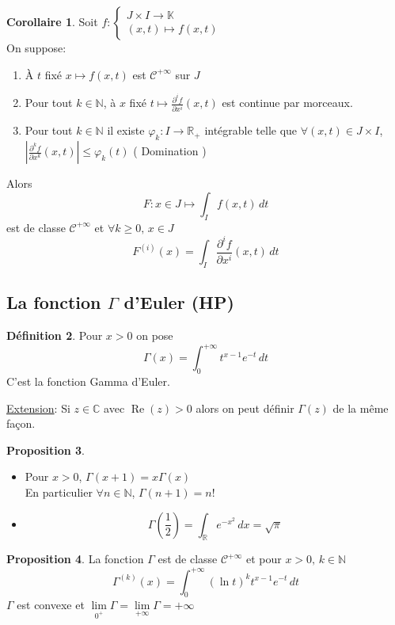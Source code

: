 \documentclass[10pt,a4paper]{article}
\theoremstyle{definition}
\newtheorem{proposition}{Proposition}[section]
\newtheorem{corollary}[proposition]{Corollaire}
\newtheorem{definition}[proposition]{Définition}
\DeclareMathOperator{\re}{Re}
\begin{document}
\begin{corollary}
    Soit \(f:\begin{cases} J \times I \to \mathbb{K} \\ (x, t) \mapsto f(x, t)\end{cases}\) \\
    On suppose:
    \begin{enumerate}
        \item À \(t\) fixé \(x \mapsto f(x, t)\) est \(\mathcal{C}^{+\infty}\) sur \(J\)
        \item Pour tout \(k \in \mathbb{N}\), à \(x\) fixé \(t \mapsto \frac{\partial^i f}{\partial x^i}(x, t)\) est continue par morceaux.
        \item Pour tout \(k \in \mathbb{N}\) il existe \(\varphi_k: I \to \mathbb{R}_+\) intégrable telle que \(\forall (x, t) \in J \times I\), \(\left| \frac{\partial^k f}{\partial x^k}(x, t) \right| \leq \varphi_k(t)\) ( Domination )
    \end{enumerate}
    Alors \[F: x \in J \mapsto \int_{I} f(x, t) \,dt\] est de classe \(\mathcal{C}^{+\infty}\) et \(\forall k \geq 0 ,\, x \in J\)
    \[\boxed{F^{(i)}(x) = \int_{I} \frac{\partial^i f}{\partial x^i}(x, t) \,dt}\]
\end{corollary}

\subsection{La fonction \(\Gamma\) d'Euler (HP)}
\begin{definition}
    Pour \(x > 0\) on pose
    \[\Gamma(x) = \int_{0}^{+\infty}t^{x - 1}e^{-t} \,dt\]
    C'est la fonction Gamma d'Euler.
\end{definition}
\noindent \uline{Extension}: Si \(z \in \mathbb{C}\) avec \(\re(z) > 0\) alors on peut définir \(\Gamma(z)\) de la même façon.
\begin{proposition}
    \hfill
    \begin{itemize}
        \item Pour \(x > 0\), \(\Gamma(x + 1) = x\Gamma(x)\) \\ En particulier \(\forall n \in \mathbb{N}\), \(\Gamma(n + 1) = n!\)
        \item \[\Gamma\left(\frac{1}{2}\right) = \int_{\mathbb{R}} e^{-x^2} \,dx = \sqrt{\pi}\]
    \end{itemize}
\end{proposition}
\begin{proposition}
    La fonction \(\Gamma\) est de classe \(\mathcal{C}^{+\infty}\) et pour \(x > 0,\, k \in \mathbb{N}\)
    \[\Gamma^{(k)}(x) = \int_{0}^{+\infty}(\ln t)^k t^{x - 1} e^{-t} \,dt\]
    \(\Gamma\) est convexe et \(\lim\limits_{0^+} \Gamma = \lim\limits_{+\infty} \Gamma = +\infty\)
\end{proposition}
\end{document}

